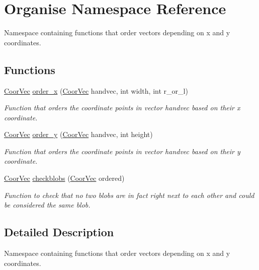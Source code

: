 \hypertarget{namespaceOrganise}{
\section{Organise Namespace Reference}
\label{namespaceOrganise}
}


Namespace containing functions that order vectors depending on x and y coordinates.  


\subsection*{Functions}
\begin{DoxyCompactItemize}
\item 
\hyperlink{blobby_8h_a7017012a1393f7249d0e03d6ac9f1c7b}{CoorVec} \hyperlink{namespaceOrganise_aec4a1cc23ca1f744d7603f28ac8c50d4}{order\_\-x} (\hyperlink{blobby_8h_a7017012a1393f7249d0e03d6ac9f1c7b}{CoorVec} handvec, int width, int r\_\-or\_\-l)
\begin{DoxyCompactList}\small\item\em Function that orders the coordinate points in vector {\itshape handvec\/} based on their x coordinate. \end{DoxyCompactList}\item 
\hyperlink{blobby_8h_a7017012a1393f7249d0e03d6ac9f1c7b}{CoorVec} \hyperlink{namespaceOrganise_a72cef579a9fd93ebe84d4609148aeb0d}{order\_\-y} (\hyperlink{blobby_8h_a7017012a1393f7249d0e03d6ac9f1c7b}{CoorVec} handvec, int height)
\begin{DoxyCompactList}\small\item\em Function that orders the coordinate points in vector {\itshape handvec\/} based on their y coordinate. \end{DoxyCompactList}\item 
\hyperlink{blobby_8h_a7017012a1393f7249d0e03d6ac9f1c7b}{CoorVec} \hyperlink{namespaceOrganise_a04ab2ae6c764f4027318f9fcabb7a3bc}{checkblobs} (\hyperlink{blobby_8h_a7017012a1393f7249d0e03d6ac9f1c7b}{CoorVec} ordered)
\begin{DoxyCompactList}\small\item\em Function to check that no two blobs are in fact right next to each other and could be considered the same blob. \end{DoxyCompactList}\end{DoxyCompactItemize}


\subsection{Detailed Description}
Namespace containing functions that order vectors depending on x and y coordinates. 

